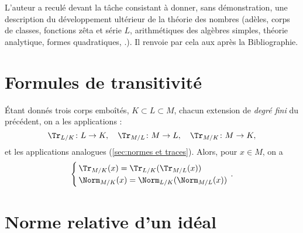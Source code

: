 \documentclass[11pt, useosf,
  title in boldface,
  theorem in new line,
  theorem numbering = section,
  number theorems separately,
]{simplivre}
\begin{document}
L'auteur a reculé devant la tâche consistant à donner, sans démonstration, une description du développement ultérieur de la théorie des nombres (adèles, corps de classes, fonctions zêta et série \( L \), arithmétiques des algèbres simples, théorie analytique, formes quadratiques, \etc.). Il renvoie par cela aux  après la Bibliographie.

\section*{Formules de transitivité}

    Étant donnés trois corps emboîtés, \( K \subset L \subset M \), chacun extension de \emph{degré fini} du précédent, on a les applications  :
    \[
        \Tr_{L/K} \colon L \to K, \quad
        \Tr_{M/L} \colon M \to L, \quad
        \Tr_{M/K} \colon M \to K,
    \]
    et les applications  analogues (\cref{sec:normes et traces}). Alors, pour \( x \in M \), on a
    \begin{equation}
        \begin{cases}
            \, \Tr_{M/K}(x) = \Tr_{L/K}(\Tr_{M/L}(x))\\
            \, \Norm_{M/K}(x) = \Norm_{L/K}(\Norm_{M/L}(x))
        \end{cases}
        \!\!\!\!\!.
    \end{equation}

\section*{Norme relative d'un idéal}
\end{document}
